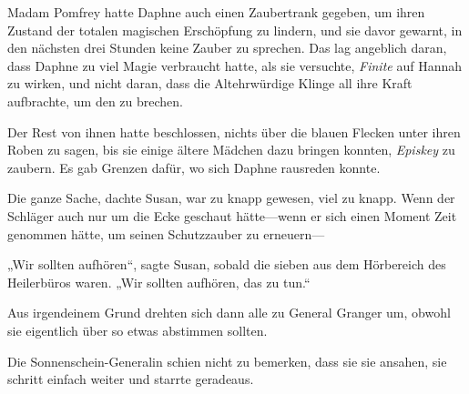 Madam Pomfrey hatte Daphne auch einen Zaubertrank gegeben, um ihren Zustand der totalen magischen Erschöpfung zu lindern, und sie davor gewarnt, in den nächsten drei Stunden keine Zauber zu sprechen. Das lag angeblich daran, dass Daphne zu viel Magie verbraucht hatte, als sie versuchte, \emph{Finite} auf Hannah zu wirken, und nicht daran, dass die Altehrwürdige Klinge all ihre Kraft aufbrachte, um den  zu brechen.

Der Rest von ihnen hatte beschlossen, nichts über die blauen Flecken unter ihren Roben zu sagen, bis sie einige ältere Mädchen dazu bringen konnten, \emph{Episkey} zu zaubern. Es gab Grenzen dafür, wo sich Daphne rausreden konnte.

Die ganze Sache, dachte Susan, war zu knapp gewesen, viel zu knapp. Wenn der Schläger auch nur um die Ecke geschaut hätte—wenn er sich einen Moment Zeit genommen hätte, um seinen Schutzzauber zu erneuern—

„Wir sollten aufhören“, sagte Susan, sobald die sieben aus dem Hörbereich des Heilerbüros waren. „Wir sollten aufhören, das zu tun.“

Aus irgendeinem Grund drehten sich dann alle zu General Granger um, obwohl sie eigentlich über so etwas abstimmen sollten.

Die Sonnenschein-Generalin schien nicht zu bemerken, dass sie sie ansahen, sie schritt einfach weiter und starrte geradeaus.

